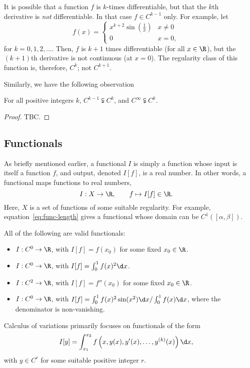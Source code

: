\begin{negg}
  It is possible that a function $f$ is $k$-times differentiable, but that the $k$th derivative is \emph{not} differentiable. In that case $f \in C^{k-1}$ only. For example, let
  \begin{equation}
    f(x) = \begin{cases}
    x^{k+2} \sin(\frac{1}{x}) & x \neq 0\\ 0 & x = 0,
    \end{cases}
  \end{equation}
  for $k=0,1,2,\dots$. Then, $f$ is $k+1$ times differentiable (for all $x \in \R$), but the $(k+1)$th derivative is not continuous (at $x=0$). The regularity class of this function is, therefore, $C^{k}$; not $C^{k+1}$.
\end{negg}

Similarly, we have the following observation
\begin{nprop}
  For all positive integers $k$, $C^{k-1} \subsetneqq C^{k}$, and $C^{\infty} \subsetneqq C^{k}$.
\end{nprop}
\begin{proof}
  TBC.
\end{proof}

\subsection{Functionals}
As briefly mentioned earlier, a functional $I$ is simply a function whose input is itself a function $f$, and output, denoted $I[f]$, is a real number. In other words, a functional maps functions to real numbers,
\begin{equation}
  I:X\to\R, \qquad f \mapsto I[f]\in\R.
\end{equation}
Here, $X$ is a set of functions of some suitable regularity. For example, equation~\eqref{eq:func-length} gives a functional whose domain can be $C^1([\alpha,\beta])$.
\begin{negg}
All of the following are valid functionals:
\begin{itemize}
\item $I : C^0 \to \R$, with $I[f]=f(x_0)$ for some fixed $x_0 \in \R$.
\item $I : C^0 \to \R$, with $I[f]=\int_{0}^{1} f(x)^2 \d x$.
\item $I : C^2 \to \R$, with $I[f]=f''(x_0)$ for some fixed $x_0 \in \R$.
\item $I : C^0 \to \R$, with $I[f]=\int_{0}^{1} f(x)^2 \sin(x^2) \d x / \int_{0}^{1} f(x) \d x$, where the denominator is non-vanishing.
\end{itemize}
\end{negg}

Calculus of variations primarily focuses on functionals of the form
\begin{equation}
  I[y] = \int_{x_1}^{x_2} f\left(x, y(x), y'(x), \dots, y^{(k)}(x)\right) \d x,
\end{equation}
with $y \in C^{r}$ for some suitable positive integer $r$.

